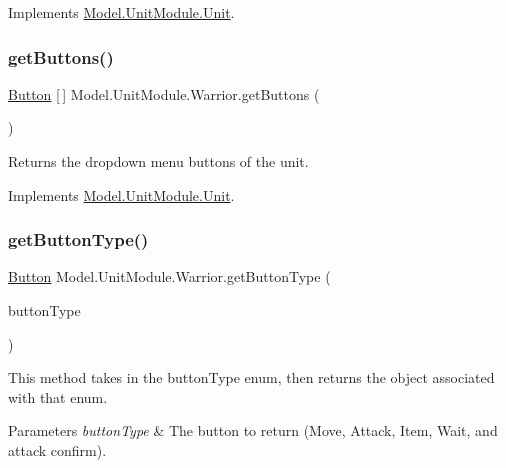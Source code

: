 Implements \hyperlink{interface_model_1_1_unit_module_1_1_unit_ac8e47a3f8d13fe8a719f962a3ee9ee46}{Model.\+Unit\+Module.\+Unit}.

\hypertarget{class_model_1_1_unit_module_1_1_warrior_af234ef405cb908c373946d012bac57be}{}\label{class_model_1_1_unit_module_1_1_warrior_af234ef405cb908c373946d012bac57be} 
\subsubsection{\texorpdfstring{get\+Buttons()}{getButtons()}}
{\footnotesize\ttfamily \hyperlink{class_model_1_1_button}{Button} \mbox{[}$\,$\mbox{]} Model.\+Unit\+Module.\+Warrior.\+get\+Buttons (\begin{DoxyParamCaption}{ }\end{DoxyParamCaption})\hspace{0.3cm}{\ttfamily [inline]}}

Returns the dropdown menu buttons of the unit. 

Implements \hyperlink{interface_model_1_1_unit_module_1_1_unit_a5256d2141e9c59e0454e47ac65246bda}{Model.\+Unit\+Module.\+Unit}.

\hypertarget{class_model_1_1_unit_module_1_1_warrior_ab0bfca3f6dc3b86e966afb7e9ef8cead}{}\label{class_model_1_1_unit_module_1_1_warrior_ab0bfca3f6dc3b86e966afb7e9ef8cead} 
\subsubsection{\texorpdfstring{get\+Button\+Type()}{getButtonType()}}
{\footnotesize\ttfamily \hyperlink{class_model_1_1_button}{Button} Model.\+Unit\+Module.\+Warrior.\+get\+Button\+Type (\begin{DoxyParamCaption}\item[{\hyperlink{namespace_model_ac76b3489c9d704f49912608bd36cd0e7}{Button\+Type}}]{button\+Type }\end{DoxyParamCaption})\hspace{0.3cm}{\ttfamily [inline]}}

This method takes in the button\+Type enum, then returns the object associated with that enum. 
\begin{DoxyParams}{Parameters}
{\em button\+Type} & The button to return (Move, Attack, Item, Wait, and attack confirm). \\
\hline
\end{DoxyParams}



